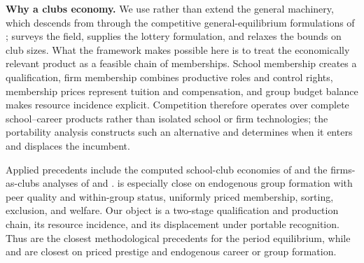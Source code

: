 \documentclass[12pt,letterpaper]{article}
\theoremstyle{definition}
\begin{document}
\textbf{Why a clubs economy.}
We use rather than extend the general machinery, which descends from
\citet{buchanan1965clubs} through the competitive general-equilibrium formulations of
\citet{ellickson1999clubs,ellickson2001clubs,ellickson2006organization};
\citet{scotchmer2002clubs} surveys the field, \citet{coleprescott1997valuation} supplies
the lottery formulation, and \citet{allouchwooders2008} relaxes the bounds on club sizes.
What the framework makes possible here is to treat the economically relevant product as a
feasible chain of memberships.
School membership creates a qualification, firm membership combines productive roles and
control rights, membership prices represent tuition and compensation, and group budget
balance makes resource incidence explicit.
Competition therefore operates over complete school--career products rather than isolated
school or firm technologies; the portability analysis constructs such an alternative and
determines when it enters and displaces the incumbent.

Applied precedents include the computed school-club economies of
\citet{caucutt2001peer,caucutt2002vouchers} and the firms-as-clubs analyses of
\citet{prescotttownsend2006firms} and \citet{zame2007incentives}.
\citet{staab2024groups} is especially close on endogenous group formation with peer
quality and within-group status, uniformly priced membership, sorting, exclusion, and
welfare.
Our object is a two-stage qualification and production chain, its resource incidence, and
its displacement under portable recognition.
Thus \citet{caucutt2001peer,caucutt2002vouchers} are the closest methodological
precedents for the period equilibrium, while \citet{ferreiranikolowa2024} and
\citet{staab2024groups} are closest on priced prestige and endogenous career or group
formation.
\end{document}

